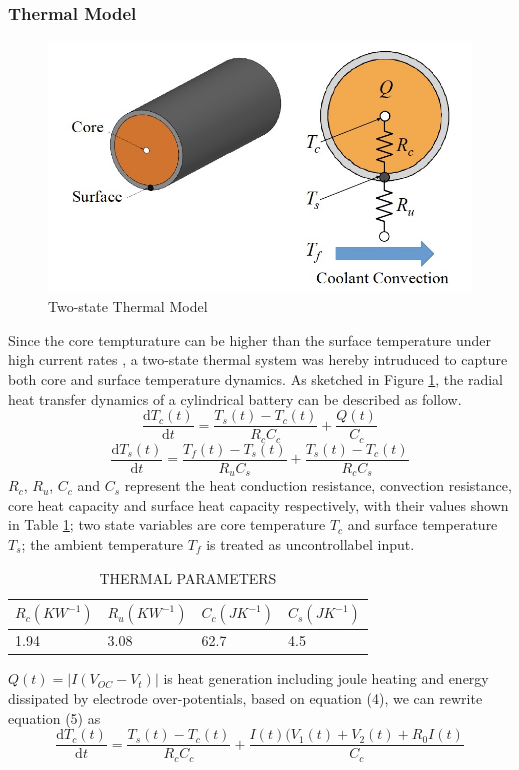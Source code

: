 \documentclass[10pt]{article}
\begin{document}
\subsubsection{Thermal Model}
\begin{figure}[H]
	\centering
	\includegraphics[height=0.3\textwidth]{thermal.jpg}
	\caption{Two-state Thermal Model}
	\label{p2}
\end{figure}
Since the core tempturature can be higher than the surface temperature under high current rates \cite{ref:2}, a two-state thermal system was hereby intruduced to capture both core and surface temperature dynamics. As sketched in Figure \ref{p2}, the radial heat transfer dynamics of a cylindrical battery can be described as follow.
\begin{equation}
	\frac{\mathrm{d}T_c(t)}{\mathrm{d} t} = \frac{T_s(t)-T_c(t)}{R_cC_c}+\frac{Q(t)}{C_c}
\end{equation}
\begin{equation}
\frac{\mathrm{d}T_s(t)}{\mathrm{d} t} = \frac{T_f(t)-T_s(t)}{R_uC_s}+\frac{T_s(t)-T_c(t)}{R_cC_s}
\end{equation}
$R_c$, $R_u$, $C_c$ and $C_s$ represent the heat conduction resistance, convection resistance, core heat capacity and surface heat capacity respectively, with their values shown in Table \ref{t5}; two state variables are core temperature $T_c$ and surface temperature $T_s$; the ambient temperature $T_f$ is treated as uncontrollabel input. 
\begin{table}[H]
	\caption{THERMAL PARAMETERS}
	\vspace{-0.4cm}
	\centering
	\begin{tabular}{llll}
		\hline
		$R_{c}(KW^{-1})$ & $R_{u}(KW^{-1})$ & $C_{c}(JK^{-1})$ & $C_{s}(JK^{-1})$ \\
		\hline
		1.94 & 3.08 & 62.7 & 4.5  \\
		\hline
	\end{tabular}
    \label{t5}
\end{table}
\noindent $Q(t)=|I(V_{OC}-V_t)|$ is heat generation including joule heating and energy dissipated by electrode over-potentials, based on equation (4), we can rewrite equation (5) as
\begin{equation}
\frac{\mathrm{d}T_c(t)}{\mathrm{d} t} = \frac{T_s(t)-T_c(t)}{R_cC_c}+\frac{I(t)(V_1(t)+V_2(t)+R_0I(t)}{C_c}
\end{equation}
\end{document}
